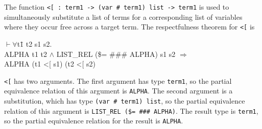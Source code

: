 \documentclass[envcountsame,runningheads]{llncs}
\newcommand{\quotient}{partial equivalence}
\begin{document}
The function {\tt <[ : term1 -> (var \# term1) list -> term1}
is used to simultaneously substitute a list of terms
for a corresponding list of variables
where they occur free across a target term.
The respectfulness theorem for {\tt <[} is
{\tt \begin{tabbing}
\hspace{5.5mm}
    $\vdash \forall$t\=1 t2 s1 s2. \\
\>       ALPHA t1 t2 $\wedge$ LIST\_REL (\$= \#\#\# ALPHA) s1 s2 $\Rightarrow$ \\
\>       ALPHA (t1 <[ s1) (t2 <[ s2)
\end{tabbing}}
{\tt <[} has two arguments.
The first argument has type {\tt term1},
so the \quotient{} relation of this argument is {\tt ALPHA}.
The second argument is a substitution, which has type {\tt (var \# term1) list},
so the \quotient{} relation of this argument is {\tt LIST\_REL (\$= \#\#\# ALPHA)}.
The result type is {\tt term1}, so the \quotient{} relation for the
result is {\tt ALPHA}.
\end{document}
